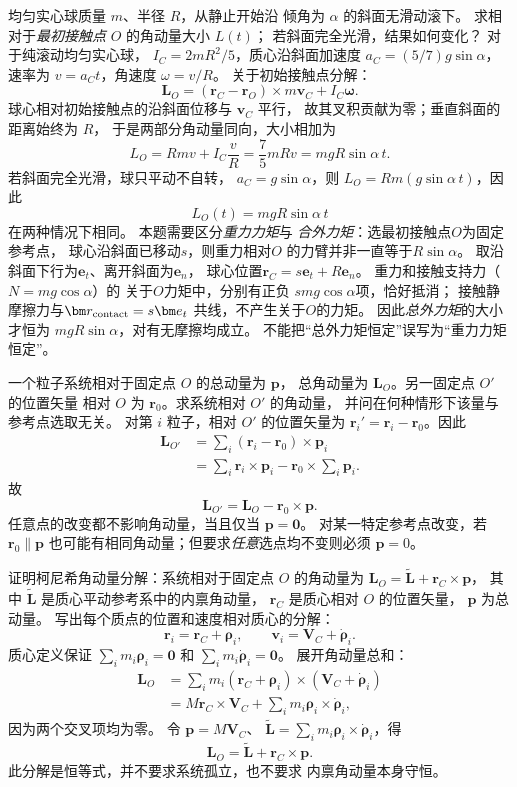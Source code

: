 均匀实心球质量 $m$、半径 $R$，从静止开始沿
倾角为 $\alpha$ 的斜面无滑动滚下。
求相对于\emph{最初接触点} $O$ 的角动量大小 $L(t)$；
若斜面完全光滑，结果如何变化？
\exsolution
对于纯滚动均匀实心球，
$I_C=2mR^2/5$，质心沿斜面加速度
$a_C=(5/7)g\sin\alpha$，
速率为 $v=a_Ct$，角速度 $\omega=v/R$。
关于初始接触点分解：
\[
\bm L_O=(\bm r_C-\bm r_O)\times m\bm v_C
+I_C\bm\omega.
\]
球心相对初始接触点的沿斜面位移与 $\bm v_C$ 平行，
故其叉积贡献为零；垂直斜面的距离始终为 $R$，
于是两部分角动量同向，大小相加为
\[
L_O=Rm v+I_C\frac vR
=\frac75mRv=mgR\sin\alpha\,t.
\]
若斜面完全光滑，球只平动不自转，
$a_C=g\sin\alpha$，则
$L_O=Rm(g\sin\alpha\,t)$，因此
\[
\boxed{L_O(t)=mgR\sin\alpha\,t}
\]
在两种情况下相同。
\excheck 本题需要区分\emph{重力力矩}与
\emph{合外力矩}：选最初接触点$O$为固定参考点，
球心沿斜面已移动$s$，则重力相对$O$
的力臂并非一直等于$R\sin\alpha$。
取沿斜面下行为$\bm e_t$、离开斜面为$\bm e_n$，
球心位置$\bm r_C=s\bm e_t+R\bm e_n$。
重力和接触支持力（$N=mg\cos\alpha$）的
关于$O$力矩中，分别有正负
$s mg\cos\alpha$项，恰好抵消；
接触静摩擦力与$\bm r_{\rm contact}=s\bm e_t$
共线，不产生关于$O$的力矩。
因此\emph{总外力矩}的大小才恒为
$mgR\sin\alpha$，对有无摩擦均成立。
不能把“总外力矩恒定”误写为“重力力矩恒定”。

一个粒子系统相对于固定点 $O$ 的总动量为 $\bm p$，
总角动量为 $\bm L_O$。另一固定点 $O'$ 的位置矢量
相对 $O$ 为 $\bm r_0$。求系统相对 $O'$ 的角动量，
并问在何种情形下该量与参考点选取无关。
\exsolution
对第 $i$ 粒子，相对 $O'$ 的位置矢量为
$\bm r_i'=\bm r_i-\bm r_0$。因此
\[
\begin{aligned}
\bm L_{O'}
&=\sum_i(\bm r_i-\bm r_0)\times\bm p_i\\
&=\sum_i\bm r_i\times\bm p_i
-\bm r_0\times\sum_i\bm p_i.
\end{aligned}
\]
故
\[
\boxed{\bm L_{O'}=\bm L_O-\bm r_0\times\bm p}.
\]
任意点的改变都不影响角动量，当且仅当
$\boxed{\bm p=\bm0}$。
\excheck 对某一特定参考点改变，若 $\bm r_0\parallel\bm p$
也可能有相同角动量；但要求\emph{任意}选点均不变则必须 $\bm p=0$。

证明柯尼希角动量分解：系统相对于固定点 $O$ 的角动量为
$\bm L_O=\widetilde{\bm L}+\bm r_C\times\bm p$，
其中 $\widetilde{\bm L}$ 是质心平动参考系中的内禀角动量，
$\bm r_C$ 是质心相对 $O$ 的位置矢量，
$\bm p$ 为总动量。
\exsolution
写出每个质点的位置和速度相对质心的分解：
\[
\bm r_i=\bm r_C+\bm\rho_i,\qquad
\bm v_i=\bm V_C+\dot{\bm\rho}_i.
\]
质心定义保证
$\sum_i m_i\bm\rho_i=\bm0$ 和
$\sum_i m_i\dot{\bm\rho}_i=\bm0$。
展开角动量总和：
\[
\begin{aligned}
\bm L_O
&=\sum_i m_i(\bm r_C+\bm\rho_i)
\times(\bm V_C+\dot{\bm\rho}_i)\\
&=M\bm r_C\times\bm V_C+
\sum_i m_i\bm\rho_i\times\dot{\bm\rho}_i,
\end{aligned}
\]
因为两个交叉项均为零。
令 $\bm p=M\bm V_C$、
$\widetilde{\bm L}=
\sum_i m_i\bm\rho_i\times\dot{\bm\rho}_i$，得
\[
\boxed{\bm L_O=\widetilde{\bm L}+\bm r_C\times\bm p}.
\]
\excheck 此分解是恒等式，并不要求系统孤立，也不要求
内禀角动量本身守恒。

